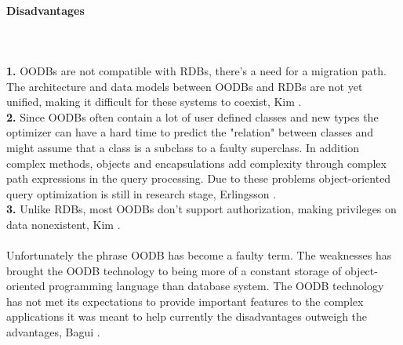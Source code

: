 \documentclass{cslthse-msc}
\begin{document}
\paragraph*{Disadvantages}\mbox{}\\\\
\textbf{1.} OODBs are not compatible with RDBs, there's a need for a migration path. The architecture and data models between OODBs and RDBs are not yet unified, making it difficult for these systems to coexist, Kim \cite{userdefinedabstractions}. \\\textbf{2.} Since OODBs often contain a lot of user defined classes and new types the optimizer can have a hard time to predict the "relation" between classes and might assume that a class is a subclass to a faulty superclass. In addition complex methods, objects and encapsulations add complexity through complex path expressions in the query processing. Due to these problems object-oriented query optimization is still in research stage, Erlingsson \cite{OODBqopt}. \\\textbf{3.} Unlike RDBs, most OODBs don't support authorization, making privileges on data nonexistent, Kim \cite{userdefinedabstractions}.\\\\
Unfortunately the phrase OODB has become a faulty term. The weaknesses has brought the OODB technology to being more of a constant storage of object-oriented programming language than database system. The OODB technology has not met its expectations to provide important features to the complex applications it was meant to help currently the disadvantages outweigh the advantages, Bagui \cite{OODBMS}.
\end{document}
